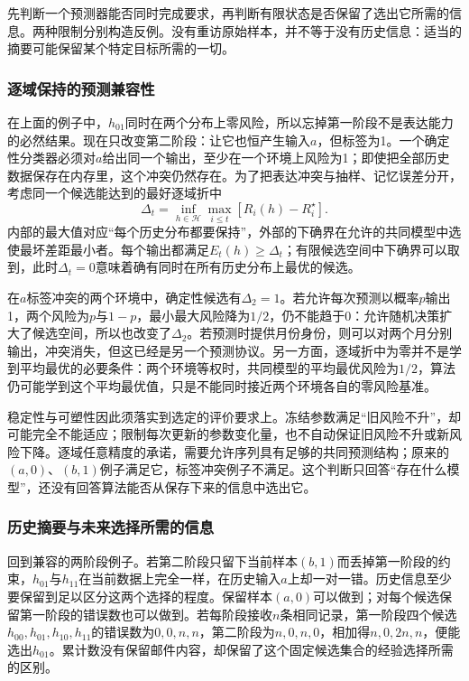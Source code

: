 先判断一个预测器能否同时完成要求，再判断有限状态是否保留了选出它所需的信息。两种限制分别构造反例。没有重访原始样本，并不等于没有历史信息：适当的摘要可能保留某个特定目标所需的一切。

\subsubsection{逐域保持的预测兼容性}

在上面的例子中，$h_{01}$同时在两个分布上零风险，所以忘掉第一阶段不是表达能力的必然结果。现在只改变第二阶段：让它也恒产生输入$a$，但标签为1。一个确定性分类器必须对$a$给出同一个输出，至少在一个环境上风险为1；即使把全部历史数据保存在内存里，这个冲突仍然存在。为了把表达冲突与抽样、记忆误差分开，考虑同一个候选能达到的最好逐域折中
\begin{equation}
 \Delta_t=\inf_{h\in\mathcal H}\max_{i\leq t}[R_i(h)-R_i^\star].
 \label{eq:continual-compatibility}
\end{equation}
内部的最大值对应“每个历史分布都要保持”，外部的下确界在允许的共同模型中选使最坏差距最小者。每个输出都满足$E_t(h)\geq\Delta_t$；有限候选空间中下确界可以取到，此时$\Delta_t=0$意味着确有同时在所有历史分布上最优的候选。

在$a$标签冲突的两个环境中，确定性候选有$\Delta_2=1$。若允许每次预测以概率$p$输出1，两个风险为$p$与$1-p$，最小最大风险降为$1/2$，仍不能趋于0：允许随机决策扩大了候选空间，所以也改变了$\Delta_2$。若预测时提供月份身份，则可以对两个月分别输出，冲突消失，但这已经是另一个预测协议。另一方面，逐域折中为零并不是学到平均最优的必要条件：两个环境等权时，共同模型的平均最优风险为$1/2$，算法仍可能学到这个平均最优值，只是不能同时接近两个环境各自的零风险基准。

稳定性与可塑性因此须落实到选定的评价要求上。冻结参数满足“旧风险不升”，却可能完全不能适应；限制每次更新的参数变化量，也不自动保证旧风险不升或新风险下降。逐域任意精度的承诺，需要允许序列具有足够的共同预测结构；原来的$(a,0)$、$(b,1)$例子满足它，标签冲突例子不满足。这个判断只回答“存在什么模型”，还没有回答算法能否从保存下来的信息中选出它。
\subsubsection{历史摘要与未来选择所需的信息}

回到兼容的两阶段例子。若第二阶段只留下当前样本$(b,1)$而丢掉第一阶段的约束，$h_{01}$与$h_{11}$在当前数据上完全一样，在历史输入$a$上却一对一错。历史信息至少要保留到足以区分这两个选择的程度。保留样本$(a,0)$可以做到；对每个候选保留第一阶段的错误数也可以做到。若每阶段接收$n$条相同记录，第一阶段四个候选$h_{00},h_{01},h_{10},h_{11}$的错误数为$0,0,n,n$，第二阶段为$n,0,n,0$，相加得$n,0,2n,n$，便能选出$h_{01}$。累计数没有保留邮件内容，却保留了这个固定候选集合的经验选择所需的区别。

